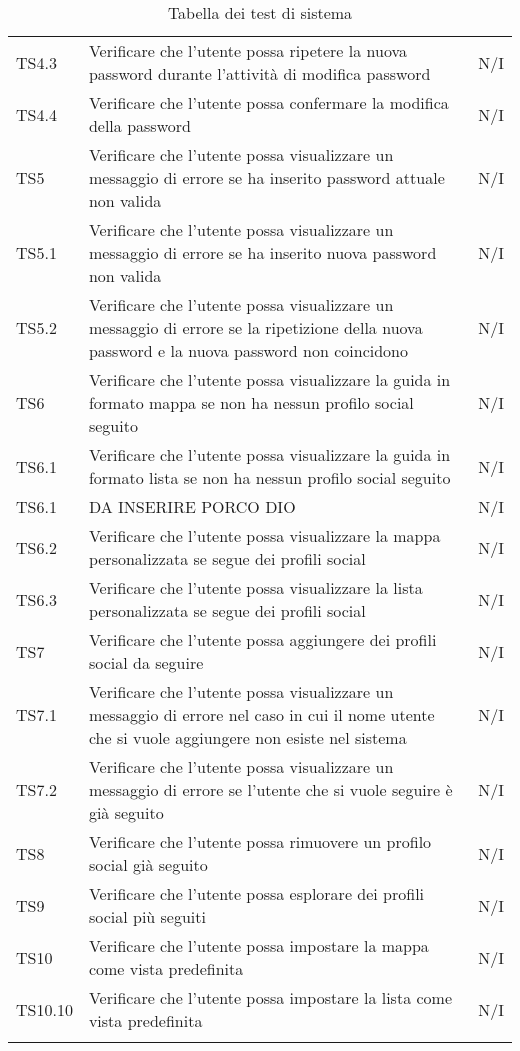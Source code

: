{\begin{longtable}{C{.3\freewidth} C{.5\freewidth} C{.3\freewidth}}
    TS4.3 & Verificare che l'utente possa ripetere la nuova password durante l'attività di modifica password& N/I  \\
    TS4.4 & Verificare che l'utente possa confermare la modifica della password & N/I  \\
    TS5 & Verificare che l'utente possa visualizzare un messaggio di errore se ha inserito password attuale  non valida & N/I  \\
    TS5.1 & Verificare che l'utente possa visualizzare un messaggio di errore se ha inserito nuova password non valida & N/I  \\
    TS5.2 & Verificare che l'utente possa visualizzare un messaggio di errore se la ripetizione della nuova password e la nuova password non coincidono & N/I  \\
    TS6 & Verificare che l'utente possa visualizzare la guida in formato mappa se non ha nessun profilo social seguito & N/I  \\
    TS6.1 & Verificare che l'utente possa visualizzare la guida in formato lista se non ha nessun profilo social seguito & N/I  \\
    TS6.1& DA INSERIRE PORCO DIO & N/I  \\
    TS6.2 & Verificare che l'utente possa visualizzare la mappa personalizzata se segue dei profili social & N/I  \\
    TS6.3 & Verificare che l'utente possa visualizzare la lista personalizzata se segue dei profili social & N/I  \\
    TS7 & Verificare che l'utente possa aggiungere dei profili social da seguire & N/I  \\
    TS7.1 & Verificare che l'utente possa visualizzare un messaggio di errore nel caso in cui il nome utente che si vuole aggiungere non esiste nel sistema & N/I  \\
    TS7.2 & Verificare che l'utente possa visualizzare un messaggio di errore se l'utente che si vuole seguire è già seguito & N/I  \\
    TS8 & Verificare che l'utente possa rimuovere un profilo social già seguito & N/I  \\
    TS9 & Verificare che l'utente possa esplorare dei profili social più seguiti & N/I  \\
    TS10 & Verificare che l'utente possa impostare  la mappa come vista predefinita & N/I  \\
    TS10.10 & Verificare che l'utente possa impostare  la lista come vista predefinita & N/I  \\
    \bottomrule
    \caption{Tabella dei test di sistema}
\end{longtable}
    
}
